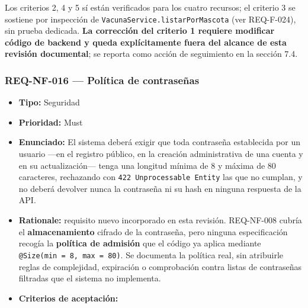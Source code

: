 \documentclass[
  spanish,
]{article}
\providecommand{\tightlist}{%
  \setlength{\itemsep}{0pt}\setlength{\parskip}{0pt}}
\begin{document}
\begin{itemize}
  Los criterios 2, 4 y 5 sí están verificados para los cuatro recursos;
  el criterio 3 se sostiene por inspección de
  \texttt{Vacuna\allowbreak{}Service.\allowbreak{}listar\allowbreak{}Por\allowbreak{}Mascota} (ver REQ-F-024), sin prueba
  dedicada. \textbf{La corrección del criterio 1 requiere modificar
  código de backend y queda explícitamente fuera del alcance de esta
  revisión documental}; se reporta como acción de seguimiento en la
  sección 7.4.
\end{itemize}

\subsubsection{REQ-NF-016 --- Política de
contraseñas}\label{req-nf-016-poluxedtica-de-contraseuxf1as}

\begin{itemize}
\tightlist
\item
  \textbf{Tipo:} Seguridad
\item
  \textbf{Prioridad:} Must
\item
  \textbf{Enunciado:} El sistema deberá exigir que toda contraseña
  establecida por un usuario ---en el registro público, en la creación
  administrativa de una cuenta y en su actualización--- tenga una
  longitud mínima de 8 y máxima de 80 caracteres, rechazando con
  \texttt{422\ Unprocessable\ E\allowbreak{}ntity} las que no cumplan, y no deberá
  devolver nunca la contraseña ni su hash en ninguna respuesta de la
  API.
\item
  \textbf{Rationale:} requisito nuevo incorporado en esta revisión.
  REQ-NF-008 cubría el \textbf{almacenamiento} cifrado de la contraseña,
  pero ninguna especificación recogía la \textbf{política de admisión}
  que el código ya aplica mediante
  \texttt{@Size(min\ =\ 8,\allowbreak{}\ max\ =\ 80)}. Se documenta la política real,
  sin atribuirle reglas de complejidad, expiración o comprobación contra
  listas de contraseñas filtradas que el sistema no implementa.
\item
  \textbf{Criterios de aceptación:}


\end{itemize}
\end{document}
